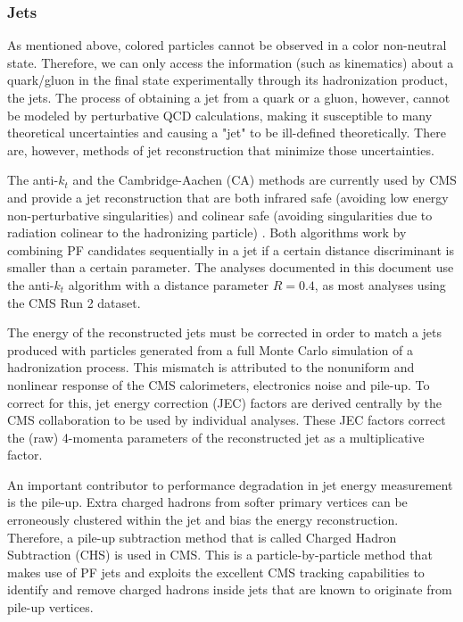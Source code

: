 \subsubsection{Jets}

As mentioned above, colored particles cannot be observed in a color non-neutral state. 
Therefore, we can only access the information (such as kinematics) about a quark/gluon in the final state experimentally through its hadronization product, the jets. 
The process of obtaining a jet from a quark or a gluon, however, cannot be modeled by perturbative QCD calculations, making it susceptible to many theoretical uncertainties and causing a "jet" to be ill-defined theoretically. 
There are, however, methods of jet reconstruction that minimize those uncertainties. 

The anti-$k_t$ and the Cambridge-Aachen (CA) methods are currently used by CMS and provide a jet reconstruction that are both infrared safe (avoiding low energy non-perturbative singularities) and colinear safe (avoiding singularities due to radiation colinear to the hadronizing particle) \cite{cms_jet}. 
Both algorithms work by combining PF candidates sequentially in a jet if a certain distance discriminant is smaller than a certain parameter. 
The analyses documented in this document use the anti-$k_t$ algorithm with a distance parameter $R=0.4$, as most analyses using the CMS Run 2 dataset.

The energy of the reconstructed jets must be corrected in order to match a jets produced with particles generated from a full Monte Carlo simulation of a hadronization process. 
This mismatch is attributed to the nonuniform and nonlinear response of the CMS calorimeters, electronics noise and pile-up. 
To correct for this, jet energy correction (JEC) factors are derived centrally by the CMS collaboration to be used by individual analyses. 
These JEC factors correct the (raw) 4-momenta parameters of the reconstructed jet as a multiplicative factor.

An important contributor to performance degradation in jet energy measurement is the pile-up. 
Extra charged hadrons from softer primary vertices can be erroneously clustered within the jet and bias the energy reconstruction. 
Therefore, a pile-up subtraction method that is called Charged Hadron Subtraction (CHS) is used in CMS. 
This is a particle-by-particle method that makes use of PF jets and exploits the excellent CMS tracking capabilities to identify and remove charged hadrons inside jets that are known to originate from pile-up vertices.

